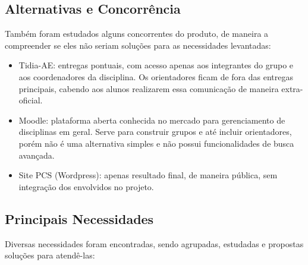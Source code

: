 \subsection{Alternativas e Concorrência}
Também foram estudados alguns concorrentes do produto, de maneira a compreender se eles não seriam soluções para as necessidades levantadas:

\begin{itemize}
    \item Tidia-AE: entregas pontuais, com acesso apenas aos integrantes do grupo e aos coordenadores da disciplina. Os orientadores ficam de fora das entregas principais, cabendo aos alunos realizarem essa comunicação de maneira extra-oficial.
    \item Moodle: plataforma aberta conhecida no mercado para gerenciamento de disciplinas em geral. Serve para construir grupos e até incluir orientadores, porém não é uma alternativa simples e não possui funcionalidades de busca avançada.
    \item Site PCS (Wordpress): apenas resultado final, de maneira pública, sem integração dos envolvidos no projeto.
\end{itemize}

\subsection{Principais Necessidades}
Diversas necessidades foram encontradas, sendo agrupadas, estudadas e propostas soluções para atendê-las:

